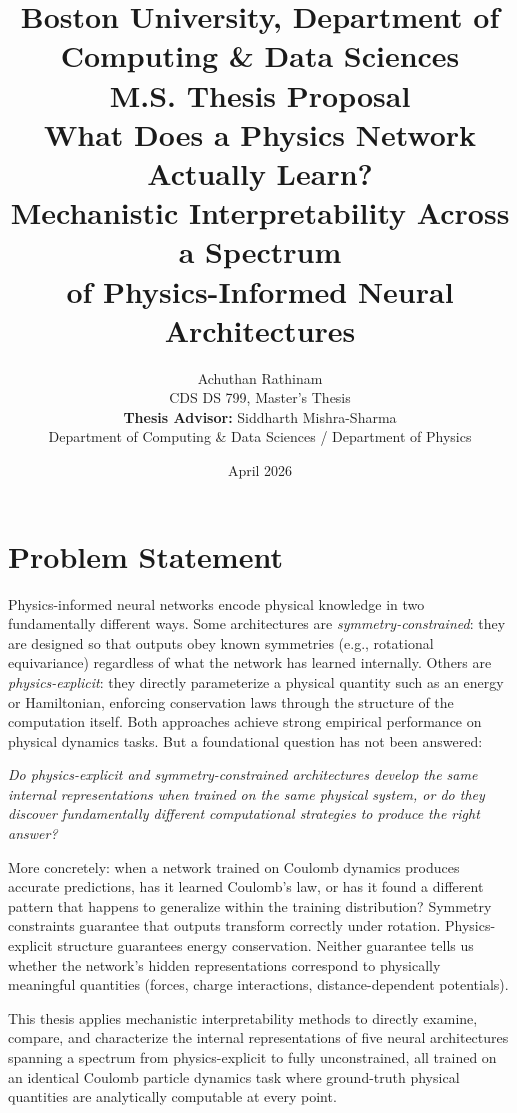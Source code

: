 \documentclass[12pt]{article}
\title{
    \vspace{-1cm}
    {\large Boston University, Department of Computing \& Data Sciences}\\[0.5em]
    {\large M.S. Thesis Proposal}\\[1em]
    \textbf{What Does a Physics Network Actually Learn?\\
    Mechanistic Interpretability Across a Spectrum\\
    of Physics-Informed Neural Architectures}\\[1em]
}
\author{
    Achuthan Rathinam\\
    \small CDS DS 799, Master's Thesis\\[0.5em]
    \small \textbf{Thesis Advisor:} Siddharth Mishra-Sharma\\
    \small Department of Computing \& Data Sciences / Department of Physics
}
\date{April 2026}
\begin{document}
\maketitle
\thispagestyle{empty}

\onehalfspacing

\section{Problem Statement}

Physics-informed neural networks encode physical knowledge in two fundamentally
different ways. Some architectures are \textit{symmetry-constrained}: they are
designed so that outputs obey known symmetries (e.g., rotational equivariance)
regardless of what the network has learned internally. Others are
\textit{physics-explicit}: they directly parameterize a physical quantity such
as an energy or Hamiltonian, enforcing conservation laws through the structure
of the computation itself. Both approaches achieve strong empirical performance
on physical dynamics tasks. But a foundational question has not been answered:

\begin{center}
\textit{Do physics-explicit and symmetry-constrained architectures develop the same internal representations when trained on the same physical system, or do they discover fundamentally different computational strategies to produce the right answer?}
\end{center}

More concretely: when a network trained on Coulomb dynamics produces accurate
predictions, has it learned Coulomb's law, or has it found a different pattern
that happens to generalize within the training distribution? Symmetry
constraints guarantee that outputs transform correctly under rotation.
Physics-explicit structure guarantees energy conservation. Neither guarantee
tells us whether the network's hidden representations correspond to physically
meaningful quantities (forces, charge interactions, distance-dependent
potentials).

This thesis applies mechanistic interpretability methods to directly examine,
compare, and characterize the internal representations of five neural
architectures spanning a spectrum from physics-explicit to fully unconstrained,
all trained on an identical Coulomb particle dynamics task where ground-truth
physical quantities are analytically computable at every point.
\end{document}
